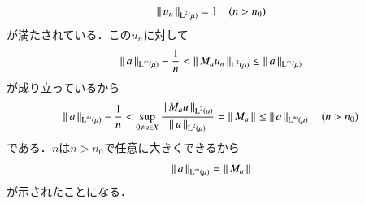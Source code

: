 \begin{prf}
\begin{description}
\begin{align}
			\Norm{u_n}{\Lp{2}{\mu}} = 1 \quad (n > n_0)
		\end{align}
		が満たされている．この$u_n$に対して
		\begin{align}
			\Norm{a}{\Lp{\infty}{\mu}} - \frac{1}{n} < \Norm{M_a u_n}{\Lp{2}{\mu}} \leq \Norm{a}{\Lp{\infty}{\mu}}
		\end{align}
		が成り立っているから
		\begin{align}
			\Norm{a}{\Lp{\infty}{\mu}} - \frac{1}{n} 
			< \sup{0 \neq u \in X}{\frac{\Norm{M_a u}{\Lp{2}{\mu}}}{\Norm{u}{\Lp{2}{\mu}}}} = \Norm{M_a}{} 
			\leq \Norm{a}{\Lp{\infty}{\mu}}
			\quad (n > n_0)
		\end{align}
		である．$n$は$n > n_0$で任意に大きくできるから
		\begin{align}
			\Norm{a}{\Lp{\infty}{\mu}} = \Norm{M_a}{}
		\end{align}
		が示されたことになる．
		

\end{description}
\end{prf}
